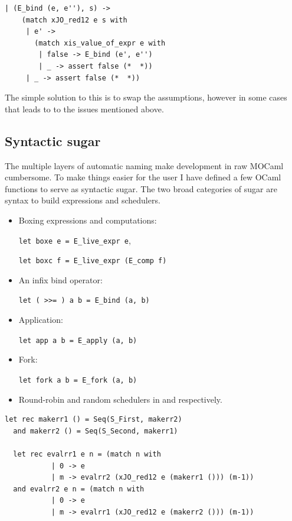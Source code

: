 \documentclass[12pt,twoside,notitlepage]{report}
\theoremstyle{plain}%
\theoremstyle{definition}
\theoremstyle{remark}
\begin{document}
\begin{minipage}{\linewidth}
\begin{lstlisting}[caption={OCaml swapped assumptions}, label={lst:ocamlswapassume}]
  | (E_bind (e, e''), s) ->
    (match xJO_red12 e s with
     | e' ->
       (match xis_value_of_expr e with
        | false -> E_bind (e', e'')
        | _ -> assert false (*  *))
     | _ -> assert false (*  *))
\end{lstlisting}

\end{minipage}
The simple solution to this is to swap the assumptions, however in some cases that leads to to the issues mentioned above.
\subsection{Syntactic sugar}
The multiple layers of automatic naming make development in raw MOCaml cumbersome.  To make things easier for the user I have defined a few OCaml functions to serve as syntactic sugar. The two broad categories of sugar are syntax to build expressions and schedulers. 
\begin{itemize}
\item{Boxing expressions and computations:

 \lstinline|let boxe e = E_live_expr e|,
 
 
 \lstinline|let boxc f = E_live_expr (E_comp f)|}
\item{An infix bind operator:


 \lstinline|let ( >>= ) a b = E_bind (a, b)|}
\item{Application:


 \lstinline|let app a b = E_apply (a, b)|}
\item{Fork:


 \lstinline|let fork a b = E_fork (a, b)|}
\item{Round-robin and random schedulers in  and  respectively.}
\end{itemize}
\begin{minipage}{\linewidth}

\begin{lstlisting}[caption={OCaml round-robin scheduler}, label={lst:ocamlrrsched}]
  let rec makerr1 () = Seq(S_First, makerr2) 
  and makerr2 () = Seq(S_Second, makerr1) 
  
  let rec evalrr1 e n = (match n with 
           | 0 -> e
           | m -> evalrr2 (xJO_red12 e (makerr1 ())) (m-1))
  and evalrr2 e n = (match n with 
           | 0 -> e
           | m -> evalrr1 (xJO_red12 e (makerr2 ())) (m-1))
\end{lstlisting}

\end{minipage}
\end{document}
